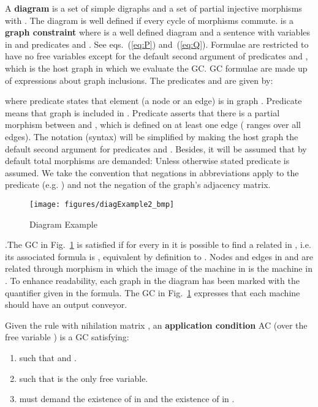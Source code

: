 \documentclass{fundam}
\newcommand{\proofend}{\hfill}
\begin{document}
A \textbf{diagram}  is a set of simple digraphs  and a set of partial injective morphisms  with . The diagram 
is well defined if every cycle of morphisms commute.  is a \textbf{graph constraint} where
 is a well defined diagram and  a sentence
with variables in  and predicates  and
. See eqs.~(\ref{eq:P}) and~(\ref{eq:Q}). Formulae are restricted
to have no free variables except for the default second argument of
predicates  and , which is the host graph  in which we
evaluate the GC. GC formulae are made up of expressions about graph
inclusions. The predicates  and  are given by:

where predicate  states that element  (a node or an edge)
is in graph .  Predicate  means that graph  is
included in . Predicate  asserts that there is a
partial morphism between  and , which is defined on at least
one edge ( ranges over all edges). The notation (syntax) will be
simplified by making the host graph  the default second argument
for predicates  and .  Besides, it will be assumed that by
default total morphisms are demanded: Unless otherwise stated
predicate  is assumed. We take the convention that negations in
abbreviations apply to the predicate (e.g. ) and not the negation of the
graph's adjacency matrix.

\begin{figure}[htbp]
  \centering
  \texttt{[image: figures/diagExample2\_bmp]}
  \caption{Diagram Example}
  \label{fig:DiagExample}
\end{figure}

.The GC in Fig.~\ref{fig:DiagExample}
is satisfied if for every  in  it is possible to find a
related  in , i.e. its associated formula is , equivalent by
definition to . Nodes and
edges in  and  are related through morphism  in
which the image of the machine in  is the machine in . To
enhance readability, each graph in the diagram has been marked with
the quantifier given in the formula. The GC in
Fig.~\ref{fig:DiagExample} expresses that each machine should have an
output conveyor. \proofend

Given the rule  with nihilation matrix , an
\textbf{application condition} AC (over the free variable ) is a
GC satisfying:
\begin{enumerate}
\item  such that  and .
\item  such that  is the only free variable.
\item  must demand the existence of  in  and the
  existence of  in .
\end{enumerate}
\end{document}
